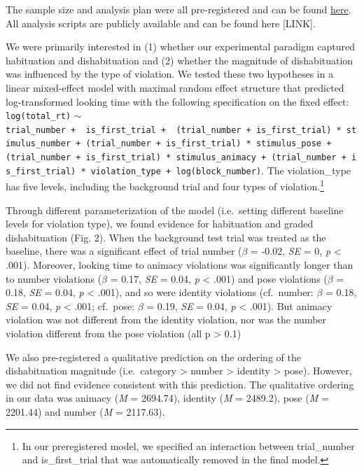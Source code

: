 \documentclass[10pt, letterpaper]{article}
\begin{document}
The sample size and analysis plan were all pre-registered and can be
found \href{https://aspredicted.org/blind.php?x=WGF_J7K}{here}. All
analysis scripts are publicly available and can be found here
{[}LINK{]}.

We were primarily interested in (1) whether our experimental paradigm
captured habituation and dishabituation and (2) whether the magnitude of
dishabituation was influenced by the type of violation. We tested these
two hypotheses in a linear mixed-effect model with maximal random effect
structure that predicted log-transformed looking time with the following
specification on the fixed effect: \texttt{log(total\_rt)} \(\sim\)
\texttt{trial\_number\ +\ \ is\_first\_trial\ +\ \ (trial\_number\ +\ is\_first\_trial)\ *\ stimulus\_number\ +\ (trial\_number\ +\ is\_first\_trial)\ *\ stimulus\_pose\ +(trial\_number\ +\ is\_first\_trial)\ *\ stimulus\_animacy\ +\ (trial\_number\ +\ is\_first\_trial)\ *\ violation\_type\ +\ log(block\_number)}.
The violation\_type has five levels, including the background trial and
four types of violation.\footnote{In our preregistered model, we
  specified an interaction between trial\_number and is\_first\_trial
  that was automatically removed in the final model.}

Through different parameterization of the model (i.e.~setting different
baseline levels for violation type), we found evidence for habituation
and graded dishabituation (Fig. 2). When the background test trial was
treated as the baseline, there was a significant effect of trial number
(\(\beta\) = -0.02, \emph{SE} = 0, \emph{p} \textless{} .001). Moreover,
looking time to animacy violations was significantly longer than to
number violations (\(\beta\) = 0.17, \emph{SE} = 0.04, \emph{p}
\textless{} .001) and pose violations (\(\beta\) = 0.18, \emph{SE} =
0.04, \emph{p} \textless{} .001), and so were identity violations
(cf.~number: \(\beta\) = 0.18, \emph{SE} = 0.04, \emph{p} \textless{}
.001; cf.~pose: \(\beta\) = 0.19, \emph{SE} = 0.04, \emph{p} \textless{}
.001). But animacy violation was not different from the identity
violation, nor was the number violation different from the pose
violation (all p \textgreater{} 0.1)

We also pre-registered a qualitative prediction on the ordering of the
dishabituation magnitude (i.e.~category \textgreater{} number
\textgreater{} identity \textgreater{} pose). However, we did not find
evidence consistent with this prediction. The qualitative ordering in
our data was animacy (\emph{M} = 2694.74), identity (\emph{M} = 2489.2),
pose (\emph{M} = 2201.44) and number (\emph{M} = 2117.63).
\end{document}
